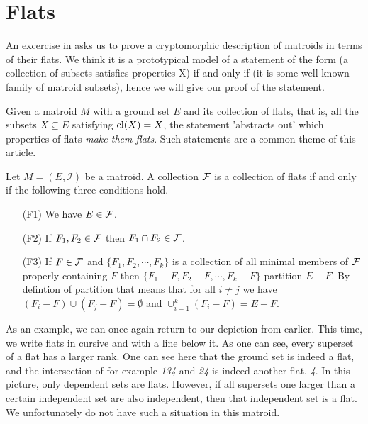 \newpage

\section{Flats}

An excercise in \cite[35]{oxley1} asks us to prove a cryptomorphic description of matroids in terms of their flats. We think it is a prototypical model of a statement of the form (a collection of subsets satisfies properties X) if and only if (it is some well known family of matroid subsets), hence we will give our proof of the statement.

    Given a matroid $M$ with a ground set $E$ and its collection of flats, that is, all the subsets $X \subseteq E$ satisfying $\mathrm{cl}(X) = X$, the statement 'abstracts out' which properties of flats \textit{make them flats}. Such statements are a common theme of this article.

\begin{theorem}
    Let $M = (E, \mathcal{I})$ be a matroid. A collection $\mathcal{F}$ is a collection of flats if and only if the following three conditions hold.

    \begin{enumerate}
        \item[(F1)] We have $E \in \mathcal{F}$.
        \item[(F2)] If $F_1, F_2 \in \mathcal{F}$ then $F_1 \cap F_2 \in \mathcal{F}$.
        \item[(F3)] If $F \in \mathcal{F}$ and $\{F_1, F_2, \cdots, F_k\}$ is a collection of all minimal members of $\mathcal{F}$ properly containing $F$ then $\{F_1-F, F_2-F, \cdots, F_k - F\}$ partition $E-F$. By defintion of partition that means that for all $i \neq j$ we have $(F_i-F)\cup (F_j - F)= \emptyset$ and $\cup_{i = 1}^{k}(F_i - F) = E - F$.
        
    \end{enumerate}
        
\end{theorem}

As an example, we can once again return to our depiction from earlier. This time, we write flats in cursive and with a line below it. As one can see, every superset of a flat has a larger rank. One can see here that the ground set is indeed a flat, and the intersection of for example \textit{134} and \textit{24} is indeed another flat, \textit{4}. In this picture, only dependent sets are flats. However, if all supersets one larger than a certain independent set are also independent, then that independent set is a flat. We unfortunately do not have such a situation in this matroid. 

